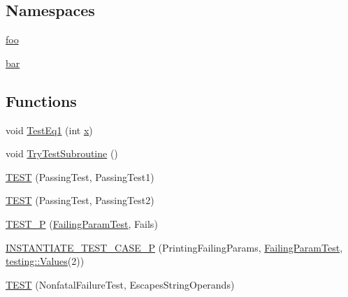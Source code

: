\subsection*{Namespaces}
\begin{DoxyCompactItemize}
\item 
 \mbox{\hyperlink{namespacefoo}{foo}}
\item 
 \mbox{\hyperlink{namespacebar}{bar}}
\end{DoxyCompactItemize}
\subsection*{Functions}
\begin{DoxyCompactItemize}
\item 
void \mbox{\hyperlink{_obj__test_2lib_2googletest-release-1_88_81_2googletest_2test_2googletest-output-test___8cc_a8f28d985b030c6dd2714d1e884c62c41}{Test\+Eq1}} (int \mbox{\hyperlink{_obj__test_2lib_2googletest-master_2googlemock_2test_2gmock-matchers__test_8cc_a6150e0515f7202e2fb518f7206ed97dc}{x}})
\item 
void \mbox{\hyperlink{_obj__test_2lib_2googletest-release-1_88_81_2googletest_2test_2googletest-output-test___8cc_a14e796981ca8d3c71dbd2b839c1ce784}{Try\+Test\+Subroutine}} ()
\item 
\mbox{\hyperlink{_obj__test_2lib_2googletest-release-1_88_81_2googletest_2test_2googletest-output-test___8cc_a62f1870b5f6ce5c731fe0606a944da39}{T\+E\+ST}} (Passing\+Test, Passing\+Test1)
\item 
\mbox{\hyperlink{_obj__test_2lib_2googletest-release-1_88_81_2googletest_2test_2googletest-output-test___8cc_aaf792b2d65c4aeb1e2f1804e2319afd2}{T\+E\+ST}} (Passing\+Test, Passing\+Test2)
\item 
\mbox{\hyperlink{_obj__test_2lib_2googletest-release-1_88_81_2googletest_2test_2googletest-output-test___8cc_a680b45844b58c5367da52c5383aea03a}{T\+E\+S\+T\+\_\+P}} (\mbox{\hyperlink{class_failing_param_test}{Failing\+Param\+Test}}, Fails)
\item 
\mbox{\hyperlink{_obj__test_2lib_2googletest-release-1_88_81_2googletest_2test_2googletest-output-test___8cc_a738114469b574e436c868a48d831f334}{I\+N\+S\+T\+A\+N\+T\+I\+A\+T\+E\+\_\+\+T\+E\+S\+T\+\_\+\+C\+A\+S\+E\+\_\+P}} (Printing\+Failing\+Params, \mbox{\hyperlink{class_failing_param_test}{Failing\+Param\+Test}}, \mbox{\hyperlink{namespacetesting_abd3c87b40c2a0663691c9b617ed5fcc2}{testing\+::\+Values}}(2))
\item 
\mbox{\hyperlink{_obj__test_2lib_2googletest-release-1_88_81_2googletest_2test_2googletest-output-test___8cc_a1ae5db2b27aea7d9f321f52002d4a501}{T\+E\+ST}} (Nonfatal\+Failure\+Test, Escapes\+String\+Operands)

\end{DoxyCompactItemize}
